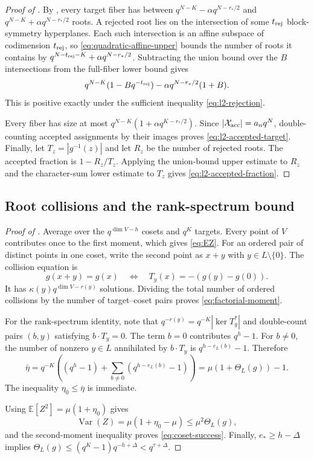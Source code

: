 \documentclass[11pt]{article}
\begin{document}
\begin{proof}[Proof of ]
By , every target fiber has between
$q^{N-K}-\alpha q^{N-r_*/2}$ and
$q^{N-K}+\alpha q^{N-r_*/2}$ roots.  A rejected root lies on
the intersection of some $t_{\rm rej}$ block-symmetry hyperplanes.  Each such
intersection is an affine subspace of codimension $t_{\rm rej}$, so
\eqref{eq:quadratic-affine-upper} bounds the number of roots it contains by
$q^{N-t_{\rm rej}-K}+\alpha q^{N-r_*/2}$.  Subtracting the union bound
over the $B$ intersections from the full-fiber lower bound gives
\[
 q^{N-K}(1-Bq^{-t_{\rm rej}})
 -\alpha q^{N-r_*/2}(1+B).
\]
This is positive exactly under the sufficient inequality
\eqref{eq:l2-rejection}.

Every fiber has size at most
$q^{N-K}(1+\alpha q^{K-r_*/2})$.  Since
$|\mathcal X_{\rm acc}|=a_n q^N$, double-counting accepted assignments by their images
proves \eqref{eq:l2-accepted-target}.  Finally, let
$T_z=|g^{-1}(z)|$ and let $R_z$ be the number of rejected roots.  The accepted
fraction is $1-R_z/T_z$.  Applying the union-bound upper estimate to $R_z$ and
the character-sum lower estimate to $T_z$ gives
\eqref{eq:l2-accepted-fraction}.
\end{proof}

\subsection{Root collisions and the rank-spectrum bound}\label{app:proof-coset-success}

\begin{proof}[Proof of ]
Average over the $q^{\dim V-h}$ cosets and $q^K$ targets.  Every point of $V$
contributes once to the first moment, which gives \eqref{eq:EZ}.  For an
ordered pair of distinct points in one coset, write the second point as $x+y$
with $y\in L\setminus\{0\}$.  The collision equation is
\[
 g(x+y)=g(x)
 \quad\Longleftrightarrow\quad
 T_y(x)=-(g(y)-g(0)).
\]
It has $\kappa(y)q^{\dim V-r(y)}$ solutions.  Dividing the total number of
ordered collisions by the number of target--coset pairs proves
\eqref{eq:factorial-moment}.

For the rank-spectrum identity, note that
$q^{-r(y)}=q^{-K}|\ker T_y^*|$ and double-count pairs $(b,y)$ satisfying
$b\cdot T_y=0$.  The term $b=0$ contributes $q^h-1$.  For $b\ne0$, the number
of nonzero $y\in L$ annihilated by $b\cdot T_y$ is
$q^{h-e_L(b)}-1$.  Therefore
\[
 \bar\eta
 =q^{-K}\left((q^h-1)+\sum_{b\ne0}(q^{h-e_L(b)}-1)\right)
 =\mu(1+\Theta_L(g))-1.
\]
The inequality $\eta_0\le\bar\eta$ is immediate.

Using $\mathbb E[Z^2]=\mu(1+\eta_0)$ gives
\[
 \operatorname{Var}(Z)
 =\mu(1+\eta_0-\mu)
 \le\mu^2\Theta_L(g),
\]
and the second-moment inequality proves \eqref{eq:coset-success}.  Finally,
$e_*\ge h-\Delta$ implies
$\Theta_L(g)\le(q^K-1)q^{-h+\Delta}<q^{\tau+\Delta}$.
\end{proof}
\end{document}
